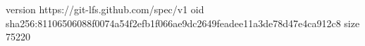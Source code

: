 version https://git-lfs.github.com/spec/v1
oid sha256:81106506088f0074a54f2efb1f066ae9dc2649feadee11a3de78d47e4ca912c8
size 75220
